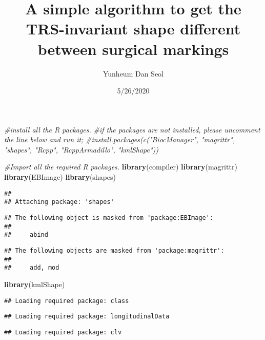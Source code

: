 \documentclass[
]{article}
\title{A simple algorithm to get the TRS-invariant shape different between
surgical markings}
\author{Yunheum Dan Seol}
\date{5/26/2020}
\newenvironment{Shaded}{\begin{snugshade}}{\end{snugshade}}
\newcommand{\CommentTok}[1]{\textcolor[rgb]{0.56,0.35,0.01}{\textit{#1}}}
\newcommand{\KeywordTok}[1]{\textcolor[rgb]{0.13,0.29,0.53}{\textbf{#1}}}
\newcommand{\NormalTok}[1]{#1}
\begin{document}
\maketitle

\begin{Shaded}
\begin{Highlighting}[]
\CommentTok{#install all the R packages.}
\CommentTok{#if the packages are not installed, please uncomment the line below and run it;}
\CommentTok{#install.packages(c("BiocManager", "magrittr", "shapes", "Rcpp", "RcppArmadillo", "kmlShape"))}
\end{Highlighting}
\end{Shaded}

\begin{Shaded}
\begin{Highlighting}[]
\CommentTok{#Import all the required R packages.}
\KeywordTok{library}\NormalTok{(compiler)}
\KeywordTok{library}\NormalTok{(magrittr)}
\KeywordTok{library}\NormalTok{(EBImage)}
\KeywordTok{library}\NormalTok{(shapes)}
\end{Highlighting}
\end{Shaded}

\begin{verbatim}
## 
## Attaching package: 'shapes'
\end{verbatim}

\begin{verbatim}
## The following object is masked from 'package:EBImage':
## 
##     abind
\end{verbatim}

\begin{verbatim}
## The following objects are masked from 'package:magrittr':
## 
##     add, mod
\end{verbatim}

\begin{Shaded}
\begin{Highlighting}[]
\KeywordTok{library}\NormalTok{(kmlShape)}
\end{Highlighting}
\end{Shaded}

\begin{verbatim}
## Loading required package: class
\end{verbatim}

\begin{verbatim}
## Loading required package: longitudinalData
\end{verbatim}

\begin{verbatim}
## Loading required package: clv
\end{verbatim}
\end{document}
